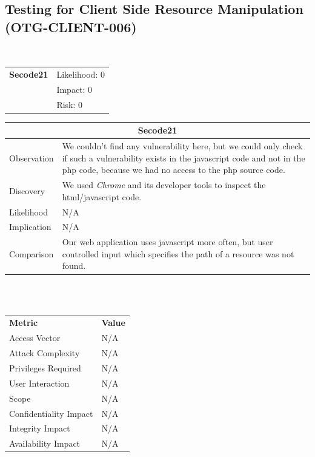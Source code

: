 \documentclass[headsepline,footsepline,footinclude=false,oneside,fontsize=11pt,paper=a4,listof=totoc,bibliography=totoc]{scrbook} %
\begin{document}
\subsection{Testing for Client Side Resource Manipulation (OTG-CLIENT-006)}\
\begin{tabular}{cR{12cm}}
	\textbf{Secode21} & Likelihood: 0\\& Impact: 0\\& Risk: 0
\end{tabular}

\begin{tabular}{ l|p{11cm}  }
	\hline
	\multicolumn{2}{c}{\textbf{Secode21}} \\
	\hline
	Observation   & We couldn't find any vulnerability here, but we could only check if such a vulnerability exists in the javascript code and not in the  php code, because we had no access to the php source code. \\
	Discovery  & We used \textit{Chrome} and its developer tools to inspect the html/javascript code. \\
	Likelihood & N/A \\
	Implication    & N/A \\
	Comparison & Our web application uses javascript more often, but user controlled input which specifies the path of a resource was not found. \\
	\hline
\end{tabular}
\\
\vspace{0.5cm}
\\
\begin{center}
	\begin{tabular}{ll}
		\rowcolor[HTML]{34CDF9}
		{\color[HTML]{ECF4FF} \textbf{Metric}}        & {\color[HTML]{ECF4FF} \textbf{Value}} \\
		\rowcolor[HTML]{BBDAFF}
		{\color[HTML]{333333} Access Vector}          & {\color[HTML]{333333} } N/A              \\
		\rowcolor[HTML]{ECF4FF}
		{\color[HTML]{333333} Attack Complexity}      & {\color[HTML]{333333} } N/A              \\
		\rowcolor[HTML]{BBDAFF}
		{\color[HTML]{333333} Privileges Required}    & {\color[HTML]{333333} } N/A              \\
		\rowcolor[HTML]{ECF4FF}
		{\color[HTML]{333333} User Interaction}       & {\color[HTML]{333333} } N/A              \\
		\rowcolor[HTML]{BBDAFF}
		{\color[HTML]{333333} Scope}                  & {\color[HTML]{333333} } N/A              \\
		\rowcolor[HTML]{ECF4FF}
		{\color[HTML]{333333} Confidentiality Impact} & {\color[HTML]{333333} } N/A              \\
		\rowcolor[HTML]{BBDAFF}
		{\color[HTML]{333333} Integrity Impact}       & {\color[HTML]{333333} } N/A              \\
		\rowcolor[HTML]{ECF4FF}
		{\color[HTML]{333333} Availability Impact}    & {\color[HTML]{333333} } N/A
	\end{tabular}
\end{center}
\pagebreak
\end{document}
